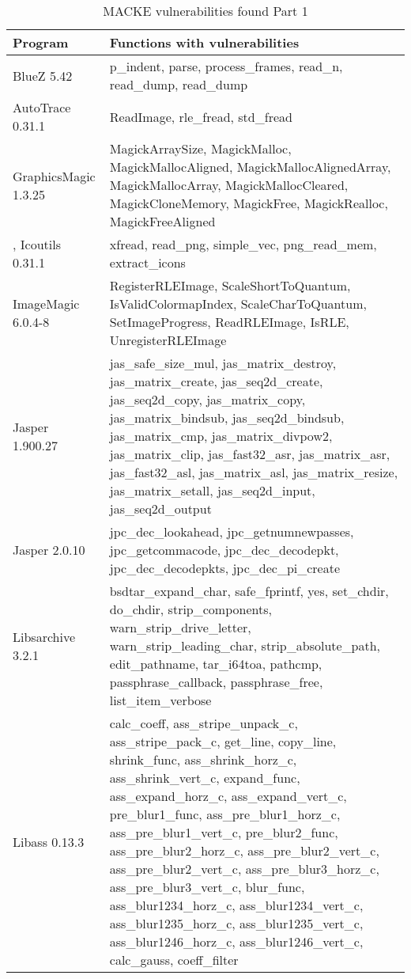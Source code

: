 \begin{table}[H]
	\centering
	\caption{MACKE vulnerabilities found Part 1}
	\begin{tabular}{ |p{4cm}||p{10cm}|  }
		\hline
		Program & Functions with vulnerabilities\\
		\hline
		BlueZ 5.42   & p\_indent, parse, process\_frames, read\_n, read\_dump, read\_dump \\
		AutoTrace 0.31.1 &   ReadImage, rle\_fread, std\_fread \\
		GraphicsMagic 1.3.25 & MagickArraySize, MagickMalloc, MagickMallocAligned, MagickMallocAlignedArray, MagickMallocArray, MagickMallocCleared, MagickCloneMemory, MagickFree, MagickRealloc, MagickFreeAligned \\
		,    Icoutils 0.31.1    & xfread, read\_png, simple\_vec, png\_read\_mem, extract\_icons \\
		ImageMagic 6.0.4-8    & RegisterRLEImage, ScaleShortToQuantum, IsValidColormapIndex, ScaleCharToQuantum, SetImageProgress, ReadRLEImage, IsRLE, UnregisterRLEImage  \\
		Jasper 1.900.27    & jas\_safe\_size\_mul, jas\_matrix\_destroy, jas\_matrix\_create, jas\_seq2d\_create, jas\_seq2d\_copy, jas\_matrix\_copy, jas\_matrix\_bindsub, jas\_seq2d\_bindsub, jas\_matrix\_cmp, jas\_matrix\_divpow2, jas\_matrix\_clip, jas\_fast32\_asr, jas\_matrix\_asr, jas\_fast32\_asl, jas\_matrix\_asl, jas\_matrix\_resize, jas\_matrix\_setall, jas\_seq2d\_input, jas\_seq2d\_output\\
		Jasper 2.0.10    & jpc\_dec\_lookahead, jpc\_getnumnewpasses, jpc\_getcommacode, jpc\_dec\_decodepkt, jpc\_dec\_decodepkts, jpc\_dec\_pi\_create\\
		Libsarchive 3.2.1    & bsdtar\_expand\_char, safe\_fprintf, yes, set\_chdir, do\_chdir, strip\_components, warn\_strip\_drive\_letter, warn\_strip\_leading\_char, strip\_absolute\_path, edit\_pathname, tar\_i64toa, pathcmp, passphrase\_callback, passphrase\_free, list\_item\_verbose\\
		Libass 0.13.3    & calc\_coeff, ass\_stripe\_unpack\_c, ass\_stripe\_pack\_c, get\_line, copy\_line, shrink\_func, ass\_shrink\_horz\_c, ass\_shrink\_vert\_c, expand\_func, ass\_expand\_horz\_c, ass\_expand\_vert\_c, pre\_blur1\_func, ass\_pre\_blur1\_horz\_c, ass\_pre\_blur1\_vert\_c, pre\_blur2\_func, ass\_pre\_blur2\_horz\_c, ass\_pre\_blur2\_vert\_c, ass\_pre\_blur2\_vert\_c, ass\_pre\_blur3\_horz\_c, ass\_pre\_blur3\_vert\_c, blur\_func, ass\_blur1234\_horz\_c, ass\_blur1234\_vert\_c, ass\_blur1235\_horz\_c, ass\_blur1235\_vert\_c, ass\_blur1246\_horz\_c, ass\_blur1246\_vert\_c, calc\_gauss, coeff\_filter \\
		\hline
	\end{tabular}
\end{table}


